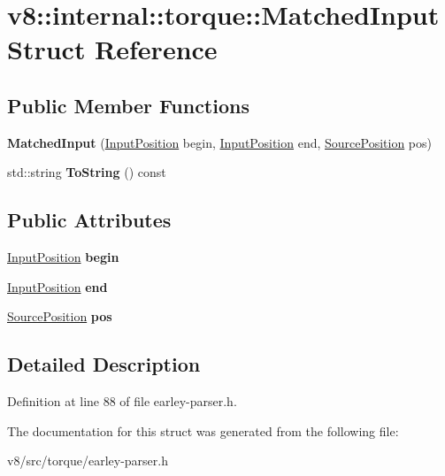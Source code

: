 \hypertarget{structv8_1_1internal_1_1torque_1_1MatchedInput}{}\section{v8\+:\+:internal\+:\+:torque\+:\+:Matched\+Input Struct Reference}
\label{structv8_1_1internal_1_1torque_1_1MatchedInput}
\subsection*{Public Member Functions}
\begin{DoxyCompactItemize}
\item 
\mbox{\label{structv8_1_1internal_1_1torque_1_1MatchedInput_a7bec23055c0c4ff55ae0350fd4847e39}} 
{\bfseries Matched\+Input} (\mbox{\hyperlink{classchar}{Input\+Position}} begin, \mbox{\hyperlink{classchar}{Input\+Position}} end, \mbox{\hyperlink{structv8_1_1internal_1_1torque_1_1SourcePosition}{Source\+Position}} pos)
\item 
\mbox{\label{structv8_1_1internal_1_1torque_1_1MatchedInput_ac915dc7dc2daa074227f77d5065a636c}} 
std\+::string {\bfseries To\+String} () const
\end{DoxyCompactItemize}
\subsection*{Public Attributes}
\begin{DoxyCompactItemize}
\item 
\mbox{\label{structv8_1_1internal_1_1torque_1_1MatchedInput_ad264ea4c663020bb10460e83899b362c}} 
\mbox{\hyperlink{classchar}{Input\+Position}} {\bfseries begin}
\item 
\mbox{\label{structv8_1_1internal_1_1torque_1_1MatchedInput_a6b145ed43cd14cb1d5b0665dcd2b1219}} 
\mbox{\hyperlink{classchar}{Input\+Position}} {\bfseries end}
\item 
\mbox{\label{structv8_1_1internal_1_1torque_1_1MatchedInput_a44c8961d9bc75b5b5aabd62b48d7cf15}} 
\mbox{\hyperlink{structv8_1_1internal_1_1torque_1_1SourcePosition}{Source\+Position}} {\bfseries pos}
\end{DoxyCompactItemize}


\subsection{Detailed Description}


Definition at line 88 of file earley-\/parser.\+h.



The documentation for this struct was generated from the following file\+:\begin{DoxyCompactItemize}
\item 
v8/src/torque/earley-\/parser.\+h\end{DoxyCompactItemize}
